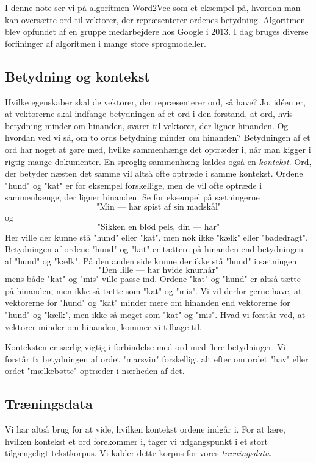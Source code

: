 \documentclass{article}
\begin{document}
I denne note ser vi på algoritmen Word2Vec som et eksempel på, hvordan man kan oversætte ord til vektorer, der repræsenterer ordenes betydning. Algoritmen blev opfundet af en gruppe medarbejdere hos Google i 2013. I dag bruges diverse forfininger af algoritmen i mange store sprogmodeller.

\subsection*{Betydning og kontekst}
Hvilke egenskaber skal de vektorer, der repræsenterer ord, så have? Jo, idéen er, at vektorerne skal indfange betydningen af et ord i den forstand, at ord, hvis betydning minder om hinanden, svarer til vektorer, der ligner hinanden. Og hvordan ved vi så, om to ords betydning minder om hinanden? Betydningen af et ord har noget at gøre med, hvilke sammenhænge det optræder i, når man kigger i rigtig mange dokumenter. En sproglig sammenhæng kaldes også en \emph{kontekst}.
Ord, der betyder næsten det samme vil altså ofte  optræde i samme  {kontekst}. Ordene "hund" og "kat" er for eksempel forskellige, men de vil ofte optræde i sammenhænge, der ligner hinanden. Se for eksempel på sætningerne
$$\text{"Min --- har spist af sin madskål"}$$
og
$$ \text{"Sikken en blød pels, din --- har"}$$
Her ville der kunne stå "hund" eller "kat", men nok ikke "kælk" eller "badedragt". Betydningen af ordene "hund" og "kat" er tættere på hinanden end betydningen af "hund" og "kælk". På den anden side kunne der ikke stå 
"hund" i sætningen
$$\text{"Den lille --- har hvide knurhår"}$$
mens både "kat" og "mis" ville passe ind. Ordene "kat" og "hund" er altså tætte på hinanden, men ikke så tætte som "kat" og "mis".
Vi vil derfor gerne have, at vektorerne for "hund" og "kat" minder mere om hinanden end vektorerne for "hund" og "kælk", men ikke så meget som "kat" og "mis". Hvad vi forstår ved, at vektorer minder om hinanden, kommer vi tilbage til. 

Konteksten er særlig vigtig i forbindelse med ord med flere betydninger. Vi forstår fx betydningen af ordet "marsvin" forskelligt alt efter om ordet "hav" eller ordet "mælkebøtte" optræder i nærheden af det.

\subsection*{Træningsdata}
Vi har altså brug for at vide, hvilken kontekst ordene indgår i. For at lære, hvilken kontekst et ord forekommer i, tager vi udgangspunkt i et stort tilgængeligt tekstkorpus. Vi kalder dette korpus for vores \emph{træningsdata}.
\end{document}

